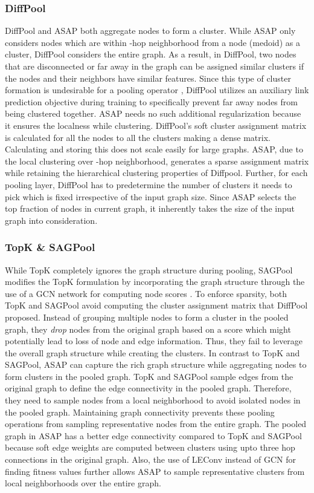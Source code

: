 \documentclass[letterpaper]{article} \usepackage{aaai20}  \usepackage{times}  \usepackage{helvet} \usepackage{courier}  \usepackage[hyphens]{url}  \usepackage{graphicx} \urlstyle{rm} \def\UrlFont{\rm}  \usepackage{graphicx}  \frenchspacing  \setlength{\pdfpagewidth}{8.5in}  \setlength{\pdfpageheight}{11in}
\begin{document}
\subsubsection{DiffPool}
DiffPool and ASAP both aggregate nodes to form a cluster. While ASAP only considers nodes which are within -hop neighborhood from a node  (medoid) as a cluster, DiffPool considers the entire graph. As a result, in DiffPool, two nodes that are disconnected or far away in the graph can be assigned similar clusters if the nodes and their neighbors have similar features. Since this type of cluster formation is undesirable for a pooling operator \cite{diffpool}, DiffPool utilizes an auxiliary link prediction objective during training to specifically prevent far away nodes from being clustered together. ASAP needs no such additional regularization because it ensures the localness while clustering. DiffPool's soft cluster assignment matrix  is calculated for all the nodes to all the clusters making  a dense matrix. Calculating and storing this does not scale easily for large graphs. ASAP, due to the local clustering over -hop neighborhood, generates a sparse assignment matrix while retaining the hierarchical clustering properties of Diffpool. Further, for each pooling layer, DiffPool has to predetermine the number of clusters it needs to pick which is fixed irrespective of the input graph size. Since ASAP selects the top  fraction of nodes in current graph, it inherently takes the size of the input graph into consideration. 






\subsubsection{TopK \& SAGPool}
While TopK completely ignores the graph structure during pooling, SAGPool modifies the TopK formulation by incorporating the graph structure through the use of a GCN network for computing node scores . To enforce sparsity, both TopK and SAGPool avoid computing the cluster assignment matrix  that DiffPool proposed. Instead of grouping multiple nodes to form a cluster in the pooled graph, they \textit{drop} nodes from the original graph   based on a score \cite{topk2} which might potentially lead to loss of node and edge information. Thus, they fail to leverage the overall graph structure while creating the clusters. In contrast to TopK and SAGPool, ASAP can capture the rich graph structure while aggregating nodes to form clusters in the pooled graph. TopK and SAGPool sample edges from the original graph to define the edge connectivity in the pooled graph. Therefore, they need to sample nodes from a local neighborhood to avoid isolated nodes in the pooled graph. Maintaining graph connectivity prevents these pooling operations from sampling representative nodes from the entire graph. The pooled graph in ASAP has a better edge connectivity compared to TopK and SAGPool because soft edge weights are computed between clusters using upto three hop connections in the original graph. Also, the use of LEConv instead of GCN for finding fitness values  further allows ASAP to sample representative clusters from local neighborhoods over the entire graph.
\end{document}
